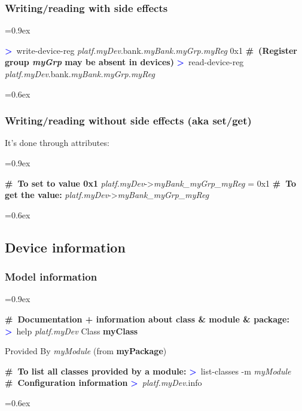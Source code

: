 \documentclass[8pt]{extarticle}
\DeclareRobustCommand{\bseries}{\fontseries{b}\selectfont}
\newenvironment{code}[1][]{%
\begin{prebox}[#1]\obeylines%
\fontdimen2\font=0.9ex%
}{%
\end{prebox}%
\fontdimen2\font=0.6ex%
}
\newcommand{\ind}{\hphantom{~~~}}
\newcommand{\sprompt}{\textcolor{blue}{\textbf{>}\ }}
\newcommand{\cmtcommon}[1]{\textcolor{Sepia}{\textbf{#1}}}
\newcommand{\cmt}[1]{\cmtcommon{\#\ #1}}
\newcommand{\p}[1]{\textit{\large#1}}
\begin{document}
\begin{multicols*}{3}
\subsubsection{Writing/reading with side effects}

\begin{code}
    \sprompt write-device-reg
    \ind \ind \p{platf.myDev}.bank.\p{myBank.myGrp.myReg} 0x1
    \cmt{(Register group \p{myGrp} may be absent in devices)}
    \sprompt read-device-reg \p{platf.myDev}.bank.\p{myBank.myGrp.myReg}
\end{code}

\subsubsection{Writing/reading {\bseries without} side effects (aka set/get)}

It's done through attributes:
\begin{code}
    \cmt{To set to value 0x1}
    \p{platf.myDev}->\p{myBank_myGrp_myReg} = 0x1
    \cmt{To get the value:}
    \p{platf.myDev}->\p{myBank_myGrp_myReg}
\end{code}

\subsection{Device information}

\subsubsection{Model information}

\begin{code}
    \cmt{Documentation + information about class \& module \& package:}
    \sprompt help \p{platf.myDev}
    Class \textbf{myClass}

    \vspace{0.3em}
    Provided By
    \ind   \p{myModule} (from \textbf{myPackage})
    \vspace{0.3em}

    \cmt{To list all classes provided by a module:}
    \sprompt list-classes -m \p{myModule}
    \cmt{Configuration information}
    \sprompt \p{platf.myDev}.info
\end{code}


\end{multicols*}
\end{document}
